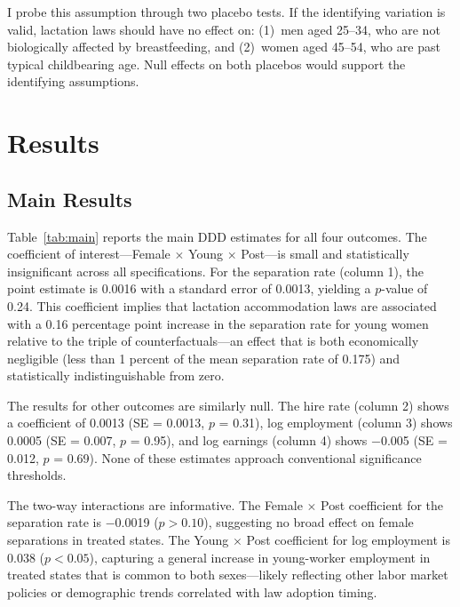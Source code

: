 \documentclass[12pt]{article}
\begin{document}
I probe this assumption through two placebo tests. If the identifying variation is valid, lactation laws should have no effect on: (1)~men aged 25--34, who are not biologically affected by breastfeeding, and (2)~women aged 45--54, who are past typical childbearing age. Null effects on both placebos would support the identifying assumptions.


\section{Results}
\label{sec:results}

\subsection{Main Results}



Table~\ref{tab:main} reports the main DDD estimates for all four outcomes. The coefficient of interest---Female $\times$ Young $\times$ Post---is small and statistically insignificant across all specifications. For the separation rate (column 1), the point estimate is 0.0016 with a standard error of 0.0013, yielding a $p$-value of 0.24. This coefficient implies that lactation accommodation laws are associated with a 0.16 percentage point increase in the separation rate for young women relative to the triple of counterfactuals---an effect that is both economically negligible (less than 1 percent of the mean separation rate of 0.175) and statistically indistinguishable from zero.

The results for other outcomes are similarly null. The hire rate (column 2) shows a coefficient of 0.0013 (SE = 0.0013, $p$ = 0.31), log employment (column 3) shows 0.0005 (SE = 0.007, $p$ = 0.95), and log earnings (column 4) shows $-$0.005 (SE = 0.012, $p$ = 0.69). None of these estimates approach conventional significance thresholds.

The two-way interactions are informative. The Female $\times$ Post coefficient for the separation rate is $-$0.0019 ($p > 0.10$), suggesting no broad effect on female separations in treated states. The Young $\times$ Post coefficient for log employment is 0.038 ($p < 0.05$), capturing a general increase in young-worker employment in treated states that is common to both sexes---likely reflecting other labor market policies or demographic trends correlated with law adoption timing.
\end{document}

